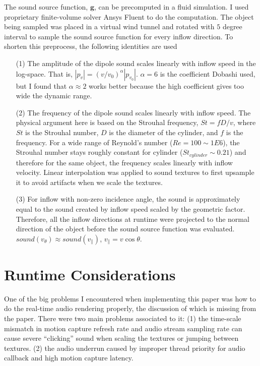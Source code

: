 \documentclass[tog]{acmsiggraph}
\def\mb{\mathbf}
\begin{document}
The sound source function, $\mb{g}$, can be precomputed in a fluid simulation. I used proprietary finite-volume solver Ansys Fluent to do the computation. The object being sampled was placed in a virtual wind tunnel and rotated with $5$ degree interval to sample the sound source function for every inflow direction. To shorten this preprocess, the following identities are used
\begin{itemize}
    \item [(1)] The amplitude of the dipole sound scales linearly with inflow speed in the log-space. That is, $|p_v| = (v/v_0)^\alpha |p_{v_0}|$. $\alpha=6$ is the coefficient Dobashi used, but I found that $\alpha \approx 2$ works better because the high coefficient gives too wide the dynamic range.
    \item [(2)] The frequency of the dipole sound scales linearly with inflow speed. The physical argument here is based on the Strouhal frequency, $St = f D/v$, where $St$ is the Strouhal number, $D$ is the diameter of the cylinder, and $f$ is the frequency. For a wide range of Reynold's number ($Re=100 \sim 1E6$), the Strouhal number stays roughly constant for cylinder ($St_{cylinder} \sim 0.21$) and therefore for the same object, the frequency scales linearly with inflow velocity. Linear interpolation was applied to sound textures to first upsample it to avoid artifacts when we scale the textures. 
    \item [(3)] For inflow with non-zero incidence angle, the sound is approximately equal to the sound created by inflow speed scaled by the geometric factor. Therefore, all the inflow directions at runtime were projected to the normal direction of the object before the sound source function was evaluated. $sound(v_\theta) \approx  sound(v_{\|})$, $v_{\|} = v \cos\theta$.

\end{itemize}


\section{Runtime Considerations} \label{section:runtime}

One of the big problems I encountered when implementing this paper was how to do the real-time audio rendering properly, the discussion of which is missing from the paper. There were two main problems associated to it: (1) the time-scale mismatch in motion capture refresh rate and audio stream sampling rate can cause severe ``clicking'' sound when scaling the textures or jumping between textures. (2) the audio underrun caused by improper thread priority for audio callback and high motion capture latency.
\end{document}
